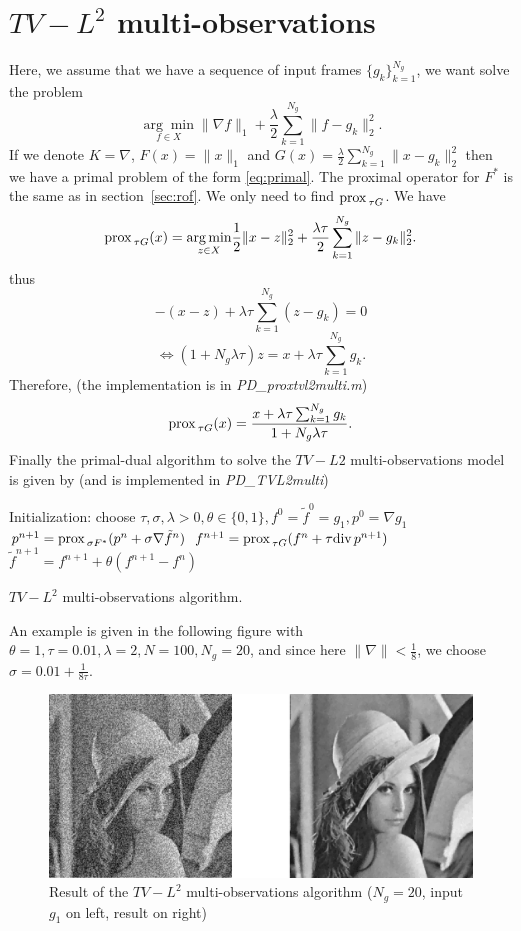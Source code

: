 \documentclass[letter,10pt]{article}
\def\Div{\textup{div\,}}
\def\prox{\textup{prox\,}}
\begin{document}
\section{$TV-L^2$ multi-observations}
Here, we assume that we have a sequence of input frames $\{g_k\}_{k=1}^{N_g}$, we want solve the problem
$$\underset{f\in X}{\arg\min}\|\nabla f\|_1+\frac{\lambda}{2}\sum_{k=1}^{N_g}\|f-g_k\|_2^2.$$
If we denote $K=\nabla$, $F(x)=\|x\|_1$ and $G(x)=\frac{\lambda}{2}\sum_{k=1}^{N_g}\|x-g_k\|_2^2$ then we have a primal problem of the form \eqref{eq:primal}. The proximal 
operator 
for $F^*$ is the same as in section~\ref{sec:rof}. We only need 
to find $\prox_{\tau G}$. We have
$$\prox_{\tau G}(x)=\underset{z\in X}{\arg\min}\frac{1}{2}\|x-z\|_2^2+\frac{\lambda\tau}{2}\sum_{k=1}^{N_g}\|z-g_k\|_2^2.$$
thus
$$-(x-z)+\lambda\tau\sum_{k=1}^{N_g}(z-g_k)=0$$
$$\Leftrightarrow (1+N_g\lambda\tau)z=x+\lambda\tau\sum_{k=1}^{N_g}g_k.$$
Therefore, (the implementation is in \textit{PD\_proxtvl2multi.m})
$$\prox_{\tau G}(x)=\frac{x+\lambda\tau\sum_{k=1}^{N_g}g_k}{1+N_g\lambda\tau}.$$
Finally the primal-dual algorithm to solve the $TV-L2$ multi-observations model is given by (and is implemented in \textit{PD\_TVL2multi})
\begin{algorithm}[H]
\begin{algorithmic}
\STATE Initialization: choose $\tau,\sigma,\lambda>0,\theta\in\{0,1\},f^0=\tilde{f}^0=g_1,p^0=\nabla g_1$
\REPEAT 
\STATE $p^{n+1}=\prox_{\sigma F^*}(p^n+\sigma \nabla\tilde{f}^n)$
\STATE $f^{n+1}=\prox_{\tau G}(f^n+\tau \Div p^{n+1})$
\STATE $\tilde{f}^{n+1}=f^{n+1}+\theta(f^{n+1}-f^n)$
\end{algorithmic}
\caption{$TV-L^2$ multi-observations algorithm.}
\end{algorithm}
An example is given in the following figure with $\theta=1,\tau=0.01,\lambda=2,N=100,N_g=20$, and since here $\|\nabla\|<\frac{1}{8}$, we choose $\sigma=0.01+\frac{1}{8\tau}$.
\begin{figure}[H]
\centering\includegraphics[width=\textwidth]{tvl2multi.png}
\caption{Result of the $TV-L^2$ multi-observations algorithm ($N_g=20$, input $g_1$ on left, result on right)}
\end{figure}
\end{document}
